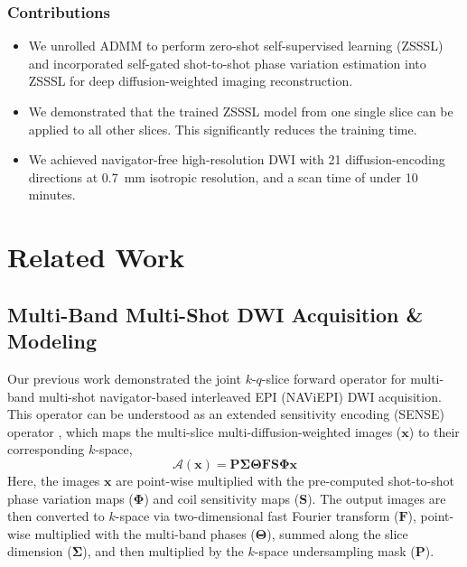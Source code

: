 \documentclass[journal,twoside,web]{ieeecolor}
\begin{document}
	\subsubsection*{Contributions}
	\begin{itemize}
		\item We unrolled ADMM to perform zero-shot self-supervised learning (ZSSSL)
		and incorporated self-gated shot-to-shot phase variation estimation 
		into ZSSSL for deep diffusion-weighted imaging reconstruction.
		\item We demonstrated that the trained ZSSSL model from one single slice 
		can be applied to all other slices. 
		This significantly reduces the training time.
		\item We achieved navigator-free high-resolution DWI with 21 diffusion-encoding
		directions at \SI{0.7}{\milli\meter} isotropic resolution,
		and a scan time of under 10 minutes.
	\end{itemize}


	\section{Related Work}


	\subsection{Multi-Band Multi-Shot DWI Acquisition \& Modeling} \label{SEC:FWD}

	Our previous work \cite{tan_2024_naviepi} demonstrated
	the joint $k$-$q$-slice forward operator
	for multi-band multi-shot navigator-based interleaved EPI (NAViEPI) DWI acquisition.
	This operator can be understood as
	an extended sensitivity encoding (SENSE) operator \cite{pruessmann_2001_gsense},
	which maps the multi-slice multi-diffusion-weighted images ($\mathbf{x}$)
	to their corresponding $k$-space,
	\begin{equation}
		\mathcal{A}(\mathbf{x}) = \mathbf{P \Sigma \Theta F S \Phi} \mathbf{x}
		\label{EQU:FWD}
	\end{equation}
	Here, the images $\mathbf{x}$ are point-wise multiplied
	with the pre-computed shot-to-shot phase variation maps ($\mathbf{\Phi}$)
	and coil sensitivity maps ($\mathbf{S}$).
	The output images are then converted to $k$-space
	via two-dimensional fast Fourier transform ($\mathbf{F}$),
	point-wise multiplied with the multi-band phases ($\mathbf{\Theta}$),
	summed along the slice dimension ($\mathbf{\Sigma}$),
	and then multiplied by the $k$-space undersampling mask ($\mathbf{P}$).
\end{document}
